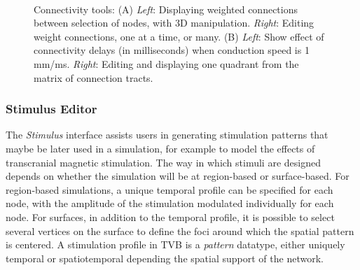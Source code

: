  \begin{figure}[!htbp]
		\centering
		\\
		\caption{Connectivity tools: 
            (A) \textit{Left}: Displaying weighted connections between selection of nodes, with 3D manipulation.
            \textit{Right}: Editing weight connections, one at a time, or many.
            (B) \textit{Left}: Show effect of connectivity delays (in milliseconds) when conduction speed is 1 mm/ms.
        \textit{Right}: Editing and displaying one quadrant from the matrix of connection tracts.}
				\label{fig:connectivity}
\end{figure}

\subsubsection{Stimulus Editor}

    The \emph{Stimulus} interface assists users in generating
	stimulation patterns that maybe be later used in a simulation, for 
    example to model the effects of transcranial magnetic stimulation.
    The way in which stimuli are designed depends on whether the simulation
    will be at region-based or surface-based.
	For region-based simulations, a
	unique temporal profile can be specified for each node, with the amplitude
	of the stimulation modulated individually for each node. For surfaces,
	in addition to the temporal profile, it is possible to select several vertices
	on the surface to define the foci around which the spatial pattern is centered.
    A stimulation profile in TVB is a \emph{pattern}
	datatype, either uniquely temporal or spatiotemporal depending the
	spatial support of the network.

